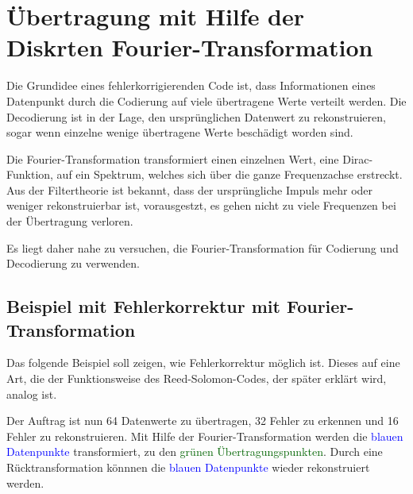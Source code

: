 %
%
\section{Übertragung mit Hilfe der Diskrten Fourier-Transformation
\label{reedsolomon:section:dtf}}
Die Grundidee eines fehlerkorrigierenden Code ist, dass Informationen eines Datenpunkt
durch die Codierung auf viele übertragene Werte verteilt werden.
Die Decodierung ist in der Lage, den ursprünglichen Datenwert zu rekonstruieren,
sogar wenn einzelne wenige übertragene Werte beschädigt worden sind.
\par
Die Fourier-Transformation transformiert einen einzelnen Wert, 
eine Dirac-Funktion, auf ein Spektrum, welches sich über die ganze Frequenzachse erstreckt.
Aus der Filtertheorie ist bekannt, dass der ursprüngliche Impuls mehr oder weniger rekonstruierbar ist,
	vorausgestzt, es gehen nicht zu viele Frequenzen bei der Übertragung verloren.
\par
Es liegt daher nahe zu versuchen, die Fourier-Transformation 
für Codierung und Decodierung zu verwenden.

\subsection{Beispiel mit Fehlerkorrektur mit Fourier-Transformation
\label{reedsolomon:subsection:sendbsp}}

Das folgende Beispiel soll zeigen, wie Fehlerkorrektur möglich ist.
Dieses auf eine Art, die der Funktionsweise des Reed-Solomon-Codes,
der später erklärt wird, analog ist.
\par
Der Auftrag ist nun 64 Datenwerte zu übertragen, 32 Fehler zu erkennen und 16 Fehler zu rekonstruieren.
Mit Hilfe der Fourier-Transformation werden die \textcolor{blue}{blauen Datenpunkte} transformiert,
zu den \textcolor{darkgreen}{grünen Übertragungspunkten}. 
Durch eine Rücktransformation könnnen die \textcolor{blue}{blauen Datenpunkte} wieder rekonstruiert werden.

